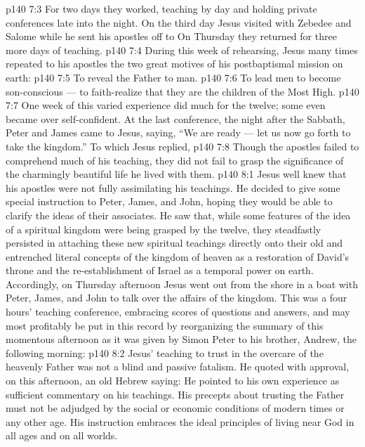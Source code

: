 \vs p140 7:3 For two days they worked, teaching by day and holding private conferences late into the night. On the third day Jesus visited with Zebedee and Salome while he sent his apostles off to  On Thursday they returned for three more days of teaching.
\vs p140 7:4 During this week of rehearsing, Jesus many times repeated to his apostles the two great motives of his postbaptismal mission on earth:
\vs p140 7:5 \bibnobreakspace To reveal the Father to man.
\vs p140 7:6 \bibnobreakspace To lead men to become son\hyp{}conscious --- to faith\hyp{}realize that they are the children of the Most High.
\vs p140 7:7 \pc One week of this varied experience did much for the twelve; some even became over self\hyp{}confident. At the last conference, the night after the Sabbath, Peter and James came to Jesus, saying, “We are ready --- let us now go forth to take the kingdom.” To which Jesus replied, 
\vs p140 7:8 Though the apostles failed to comprehend much of his teaching, they did not fail to grasp the significance of the charmingly beautiful life he lived with them.
\vs p140 8:1 Jesus well knew that his apostles were not fully assimilating his teachings. He decided to give some special instruction to Peter, James, and John, hoping they would be able to clarify the ideas of their associates. He saw that, while some features of the idea of a spiritual kingdom were being grasped by the twelve, they steadfastly persisted in attaching these new spiritual teachings directly onto their old and entrenched literal concepts of the kingdom of heaven as a restoration of David’s throne and the re\hyp{}establishment of Israel as a temporal power on earth. Accordingly, on Thursday afternoon Jesus went out from the shore in a boat with Peter, James, and John to talk over the affairs of the kingdom. This was a four hours’ teaching conference, embracing scores of questions and answers, and may most profitably be put in this record by reorganizing the summary of this momentous afternoon as it was given by Simon Peter to his brother, Andrew, the following morning:
\vs p140 8:2 \bibnobreakspace {} Jesus’ teaching to trust in the overcare of the heavenly Father was not a blind and passive fatalism. He quoted with approval, on this afternoon, an old Hebrew saying:  He pointed to his own experience as sufficient commentary on his teachings. His precepts about trusting the Father must not be adjudged by the social or economic conditions of modern times or any other age. His instruction embraces the ideal principles of living near God in all ages and on all worlds.
